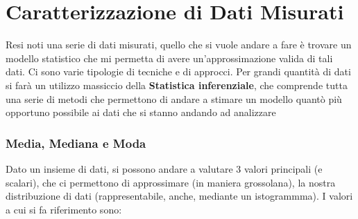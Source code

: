\chapter{Caratterizzazione di Dati Misurati}
Resi noti una serie di dati misurati, quello che si vuole andare a fare è trovare un modello statistico che mi permetta di avere un'approssimazione valida di tali dati. Ci sono varie tipologie di tecniche e di approcci. Per grandi quantità di dati si farà un utilizzo massiccio della \textbf{Statistica inferenziale}, che comprende tutta una serie di metodi che permettono di andare a stimare un modello quantò più opportuno possibile ai dati che si stanno andando ad analizzare

\subsection{Media, Mediana e Moda}
Dato un insieme di dati, si possono andare a valutare 3 valori principali (e scalari), che ci permettono di approssimare (in maniera grossolana), la nostra distribuzione di dati (rappresentabile, anche, mediante un istogrammma). I valori a cui si fa riferimento sono:
